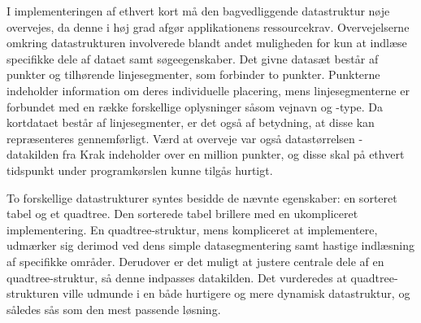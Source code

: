 \label{datastruktur}
I implementeringen af ethvert kort må den bagvedliggende datastruktur nøje overvejes, da denne i høj grad afgør applikationens ressourcekrav. Overvejelserne omkring datastrukturen involverede blandt andet muligheden for kun at indlæse specifikke dele af dataet samt søgeegenskaber. Det givne datasæt består af punkter og tilhørende linjesegmenter, som forbinder to punkter. Punkterne indeholder information om deres individuelle placering, mens linjesegmenterne er forbundet med en række forskellige oplysninger såsom vejnavn og -type. Da kortdataet består af linjesegmenter, er det også af betydning, at disse kan repræsenteres gennemførligt. Værd at overveje var også datastørrelsen - datakilden fra Krak indeholder over en million punkter, og disse skal på ethvert tidspunkt under programkørslen kunne tilgås hurtigt.

To forskellige datastrukturer syntes besidde de nævnte egenskaber: en sorteret tabel og et quadtree. Den sorterede tabel brillere med en ukompliceret implementering. En quadtree-struktur, mens kompliceret at implementere, udmærker sig derimod ved dens simple datasegmentering samt hastige indlæsning af specifikke områder. Derudover er det muligt at justere centrale dele af en quadtree-struktur, så denne indpasses datakilden. Det vurderedes at quadtree-strukturen ville udmunde i en både hurtigere og mere dynamisk datastruktur, og således sås som den mest passende løsning.
